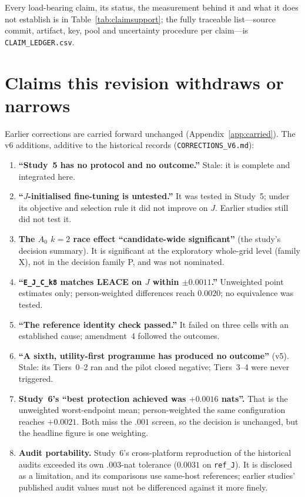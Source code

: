 \documentclass[10pt]{article}
\begin{document}
Every load-bearing claim, its status, the measurement behind it and what it does not establish is in
Table~\ref{tab:claimsupport}; the fully traceable list---source commit, artifact, key, pool and uncertainty
procedure per claim---is \texttt{CLAIM\_LEDGER.csv}.

\section{Claims this revision withdraws or narrows}
\label{sec:withdrawn}

Earlier corrections are carried forward unchanged (Appendix~\ref{app:carried}). The v6 additions, additive to
the historical records (\texttt{CORRECTIONS\_V6.md}):
\begin{enumerate}\itemsep1pt
\item \textbf{``Study~5 has no protocol and no outcome.''} Stale: it is complete and integrated here.
\item \textbf{``$J$-initialised fine-tuning is untested.''} It was tested in Study~5; under its objective and
selection rule it did not improve on $J$. Earlier studies still did not test it.
\item \textbf{The $A_0$ $k=2$ race effect ``candidate-wide significant''} (the study's decision summary). It is
significant at the exploratory whole-grid level (family X), not in the decision family P, and was not nominated.
\item \textbf{``\texttt{E\_J\_C\_k8} matches LEACE on $J$ within $\pm0.0011$.''} Unweighted point estimates only;
person-weighted differences reach $0.0020$; no equivalence was tested.
\item \textbf{``The reference identity check passed.''} It failed on three cells with an established cause;
amendment~4 followed the outcomes.
\item \textbf{``A sixth, utility-first programme has produced no outcome''} (v5). Stale: its Tiers~0--2 ran and
the pilot closed negative; Tiers~3--4 were never triggered.
\item \textbf{Study~6's ``best protection achieved was $+0.0016$ nats''.} That is the unweighted worst-endpoint
mean; person-weighted the same configuration reaches $+0.0021$. Both miss the $.001$ screen, so the decision is
unchanged, but the headline figure is one weighting.
\item \textbf{Audit portability.} Study~6's cross-platform reproduction of the historical audits exceeded its
own $.003$-nat tolerance ($0.0031$ on \texttt{ref\_J}). It is disclosed as a limitation, and its comparisons use
same-host references; earlier studies' published audit values must not be differenced against it more finely.
\end{enumerate}
\end{document}
